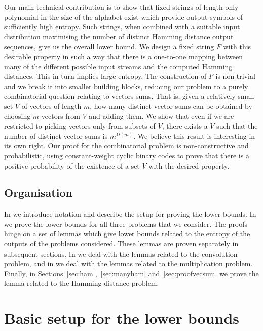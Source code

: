 \documentclass{toc}
\begin{document}
Our main technical contribution is to show that fixed strings of length only polynomial in the size of the alphabet exist which provide output symbols of sufficiently high entropy.  Such strings, when combined with a suitable input distribution maximising the number of distinct Hamming distance output sequences, give us the overall lower bound.
We design a fixed string $F$ with this desirable property in such a way that there is a one-to-one mapping between many of the different possible input streams and the %
computed Hamming distances. This in turn implies large entropy.
The construction of $F$ is non-trivial and we break it into smaller building blocks, reducing our problem to a purely combinatorial question relating to vectors sums.
That is, given a relatively small set $V$ of vectors of length $m$, how many distinct vector sums can be obtained by choosing $m$ vectors from $V$ and adding them. We show that even if we are restricted to picking vectors only from subsets of $V$, there exists a $V$ such that the number of distinct vector sums is  $m^{\Omega(m)}$. We believe this result is interesting in its own right. Our proof for the combinatorial problem is non-constructive and probabilistic, using
%
constant-weight   %
cyclic binary codes to prove that there is a positive probability of the existence of a set $V$ with the desired property.

%



\subsection{Organisation}

In  we introduce notation and describe the setup for proving the lower bounds.
In  we prove the lower bounds for all three problems that we consider. The proofs hinge on a set of lemmas which give lower bounds related to the entropy of the outputs of the problems considered. These lemmas are proven separately in subsequent sections.
In  we deal with the lemmas related to the convolution problem, and
in  we deal with the lemmas related to the multiplication problem.
Finally, in Sections~\ref{sec:ham},~\ref{sec:manyham} and~\ref{sec:proofvecsum} we prove the lemma related to the Hamming distance problem.



\section{Basic setup for the lower bounds}\label{sec:preliminaries}
\end{document}
